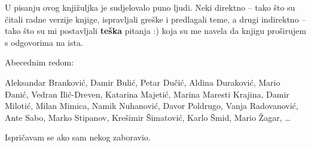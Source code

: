 
U pisanju ovog knjižuljka je sudjelovalo puno ljudi.
Neki direktno -- tako što su čitali radne verzije knjige, ispravljali greške i predlagali teme, a drugi indirektno -- tako što su mi postavljali \textbf{teška} pitanja :) koja su me navela da knjigu proširujem s odgovorima na ista.

Abecednim redom:

Aleksandar Branković,
Damir Bulić,
Petar Dučić,
Aldina Duraković,
Mario Đanić,
Vedran Ilić-Dreven,
Katarina Majetić,
Marina Maresti Krajina,
Damir Milotić, 
Milan Mimica,
Namik Nuhanović,
Davor Poldrugo,
Vanja Radovanović,
Ante Sabo,
Marko Stipanov,
Krešimir Šimatović,
Karlo Šmid,
Mario Žagar,
\dots

Ispričavam se ako sam nekog zaboravio.
